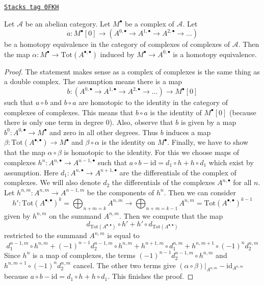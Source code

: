 \begin{lemma}
\label{homology-lemma-homotopy-complex-complexes}
\href{https://stacks.math.columbia.edu/tag/0FKH}{\texttt{Stacks tag 0FKH}}

Let $\mathcal{A}$ be an abelian category.
Let $M^\bullet$ be a complex of $\mathcal{A}$. Let
$$
a :
M^\bullet[0]
\longrightarrow
\left(A^{0, \bullet} \to A^{1, \bullet} \to A^{2, \bullet} \to \ldots \right)
$$
be a homotopy equivalence in the category of complexes of complexes
of $\mathcal{A}$. Then the map
$\alpha : M^\bullet \to \text{Tot}(A^{\bullet, \bullet})$
induced by $M^\bullet \to A^{0, \bullet}$ is a homotopy equivalence.
\end{lemma}

\begin{proof}
The statement makes sense as a complex of complexes is the same thing
as a double complex. The assumption means there is a map
$$
b :
\left(A^{0, \bullet} \to A^{1, \bullet} \to A^{2, \bullet} \to \ldots \right)
\longrightarrow
M^\bullet[0]
$$
such that $a \circ b$ and $b \circ a$ are homotopic to the identity
in the category of complexes of complexes. This means that $b \circ a$
is the identity of $M^\bullet[0]$ (because there is only one term in
degree $0$). Also, observe that $b$ is given by a map
$b^0 : A^{0, \bullet} \to M^\bullet$ and zero in all other degrees.
Thus $b$ induces a map
$\beta : \text{Tot}(A^{\bullet, \bullet}) \to M^\bullet$
and $\beta \circ \alpha$ is the identity on $M^\bullet$.
Finally, we have to show that the map
$\alpha \circ \beta$ is homotopic to the identity.
For this we choose maps of complexes
$h^n : A^{n, \bullet} \to A^{n - 1, \bullet}$
such that $a \circ b - \text{id} = d_1 \circ h + h \circ d_1$
which exist by assumption. Here $d_1 : A^{n, \bullet} \to A^{n + 1, \bullet}$
are the differentials of the complex of complexes. We will also
denote $d_2$ the differentials of the complexes $A^{n, \bullet}$
for all $n$. Let $h^{n, m} : A^{n, m} \to A^{n - 1, m}$ be the components of
$h^n$. Then we can consider
$$
h' : \text{Tot}(A^{\bullet, \bullet})^k =
\bigoplus\nolimits_{n + m = k} A^{n, m}
\to
\bigoplus\nolimits_{n + m = k - 1} A^{n, m} =
\text{Tot}(A^{\bullet, \bullet})^{k - 1}
$$
given by $h^{n, m}$ on the summand $A^{n, m}$. Then we compute
that the map
$$
d_{\text{Tot}(A^{\bullet, \bullet})} \circ h' +
h' \circ d_{\text{Tot}(A^{\bullet, \bullet})}
$$
restricted to the summand $A^{n, m}$ is equal to
$$
d_1^{n - 1, m} \circ h^{n, m} +
(-1)^{n - 1} d_2^{n - 1, m} \circ h^{n, m} +
h^{n + 1, m} \circ d_1^{n, m} + h^{n, m + 1} \circ (-1)^nd_2^{n, m}
$$
Since $h^n$ is a map of complexes, the terms
$(-1)^{n - 1} d_2^{n - 1, m} \circ h^{n, m}$ and
$h^{n, m + 1} \circ (-1)^nd_2^{n, m}$ cancel.
The other two terms give
$(\alpha \circ \beta)|_{A^{n, m}} - \text{id}_{A^{n, m}}$
because $a \circ b - \text{id} = d_1 \circ h + h \circ d_1$.
This finishes the proof.
\end{proof}

